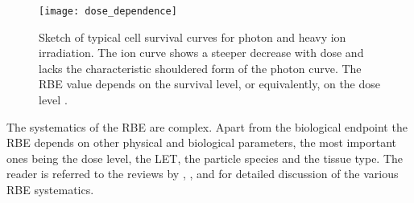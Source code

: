\begin{figure}[tbp]
  \centering
  \texttt{[image: dose\_dependence]}
  \caption[Dose dependence.]{Sketch of typical cell survival curves
    for photon and heavy ion irradiation. The ion curve shows a
    steeper decrease with dose and lacks the characteristic shouldered
    form of the photon curve. The \ac{RBE} value depends on the
    survival level, or equivalently, on the dose level
    \citep{Schardt2010}.}
  \label{fig:background:dosedependence}
\end{figure}


The systematics of the \ac{RBE} are complex. Apart from the biological
endpoint the \ac{RBE} depends on other physical and biological
parameters, the most important ones being the dose level, the
\ac{LET}, the particle species and the tissue type. The reader is
referred to the reviews by \citet{Kraft2000}, \citet{Scholz2003},
\citet{Fokas2009} and \citet{Schardt2010} for detailed discussion of
the various \ac{RBE} systematics.
%
% 
